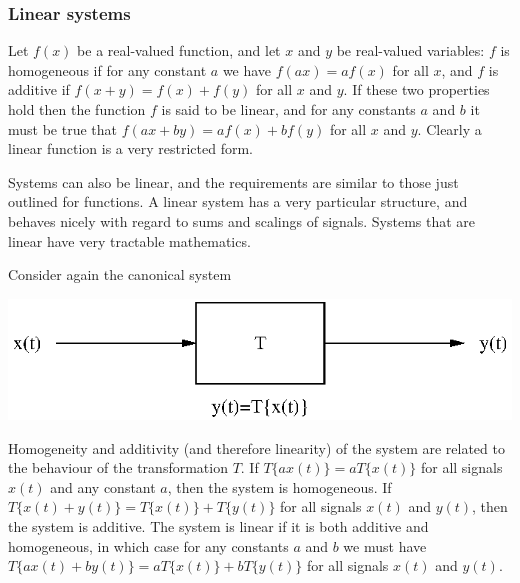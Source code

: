 \documentclass[10pt]{beamer}
\begin{document}
\subsubsection{Linear systems}

Let $f(x)$ be a real-valued function, and let $x$ and $y$ be real-valued variables:  $f$ is homogeneous if for any constant $a$ we have $f(ax) = af(x)$ for all $x$, and $f$ is additive if $f(x+y) = f(x) + f(y)$ for all $x$ and $y$.  If these two properties hold then the function $f$ is said to be linear, and for any constants $a$ and $b$ it must be true that $f(a x + b y) = a f(x) + b f(y)$ for all $x$ and $y$.  Clearly a linear function is a very restricted form.

Systems can also be linear, and the requirements are similar to those just outlined for functions.  A linear system has a very particular structure, and behaves nicely with regard to sums and scalings of signals.  Systems that are linear have very tractable mathematics.

Consider again the canonical system
\begin{center}
  \includegraphics{simplesystem}
\end{center}
Homogeneity and additivity (and therefore linearity) of the system are related to the behaviour of the transformation $T$.  If $T\{a x(t)\} = a T\{x(t)\}$ for all signals $x(t)$ and any constant $a$, then the system is homogeneous.  If $T\{x(t) + y(t)\} = T\{x(t)\} + T\{y(t)\}$ for all signals $x(t)$ and $y(t)$, then the system is additive.  The system is linear if it is both additive and homogeneous, in which case for any constants $a$ and $b$ we must have $T\{a x(t) + b y(t)\} = a T\{x(t)\} + b T\{y(t)\}$ for all signals $x(t)$ and $y(t)$.
\end{document}
